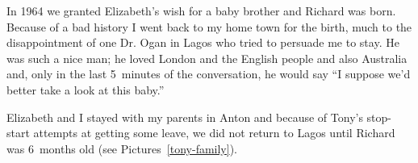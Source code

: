 In 1964 we granted Elizabeth's wish for a baby brother and Richard was
born. Because of a bad history I went back to my home town for the
birth, much to the disappointment of one Dr. Ogan in Lagos who tried
to persuade me to stay. He was such a nice man; he loved London and
the English people and also Australia and, only in the last 5~minutes
of the conversation, he would say ``I suppose we'd better take a look
at this baby.''

Elizabeth and I stayed with my parents in Anton and because of Tony's
stop-start attempts at getting some leave, we did not return to Lagos
until Richard was 6~months old (see Pictures~\ref{tony-family}).



